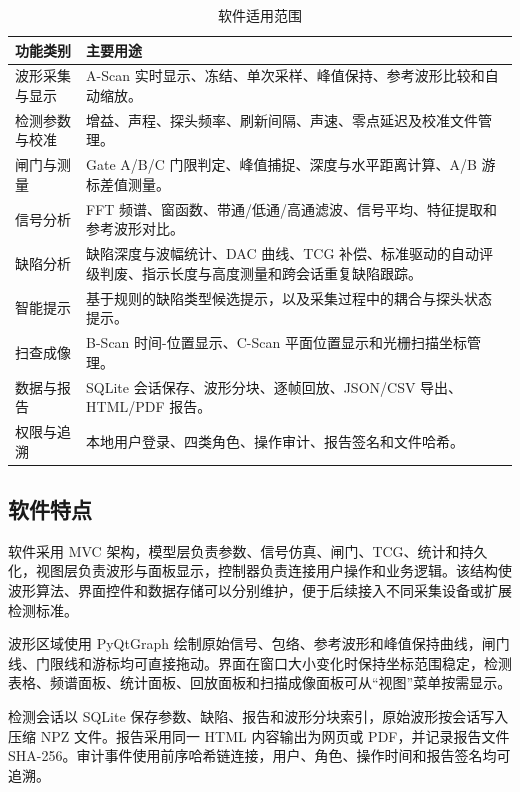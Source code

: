 \begin{table}[htbp]
	\centering
	\caption{软件适用范围}
	\label{tab:software_scope}
	\begin{tabular}{p{}p{}}
		\toprule
		\textbf{功能类别} & \textbf{主要用途} \\
		\midrule
		波形采集与显示 & A-Scan 实时显示、冻结、单次采样、峰值保持、参考波形比较和自动缩放。 \\
		检测参数与校准 & 增益、声程、探头频率、刷新间隔、声速、零点延迟及校准文件管理。 \\
		闸门与测量 & Gate A/B/C 门限判定、峰值捕捉、深度与水平距离计算、A/B 游标差值测量。 \\
		信号分析 & FFT 频谱、窗函数、带通/低通/高通滤波、信号平均、特征提取和参考波形对比。 \\
		缺陷分析 & 缺陷深度与波幅统计、DAC 曲线、TCG 补偿、标准驱动的自动评级判废、指示长度与高度测量和跨会话重复缺陷跟踪。 \\
		智能提示 & 基于规则的缺陷类型候选提示，以及采集过程中的耦合与探头状态提示。 \\
		扫查成像 & B-Scan 时间-位置显示、C-Scan 平面位置显示和光栅扫描坐标管理。 \\
		数据与报告 & SQLite 会话保存、波形分块、逐帧回放、JSON/CSV 导出、HTML/PDF 报告。 \\
		权限与追溯 & 本地用户登录、四类角色、操作审计、报告签名和文件哈希。 \\
		\bottomrule
	\end{tabular}
\end{table}

\subsection{软件特点}
\par
软件采用 MVC 架构，模型层负责参数、信号仿真、闸门、TCG、统计和持久化，视图层负责波形与面板显示，控制器负责连接用户操作和业务逻辑。该结构使波形算法、界面控件和数据存储可以分别维护，便于后续接入不同采集设备或扩展检测标准。
\par
波形区域使用 PyQtGraph 绘制原始信号、包络、参考波形和峰值保持曲线，闸门线、门限线和游标均可直接拖动。界面在窗口大小变化时保持坐标范围稳定，检测表格、频谱面板、统计面板、回放面板和扫描成像面板可从“视图”菜单按需显示。
\par
检测会话以 SQLite 保存参数、缺陷、报告和波形分块索引，原始波形按会话写入压缩 NPZ 文件。报告采用同一 HTML 内容输出为网页或 PDF，并记录报告文件 SHA-256。审计事件使用前序哈希链连接，用户、角色、操作时间和报告签名均可追溯。


